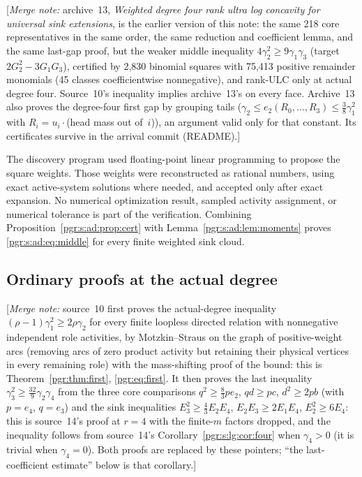 \documentclass[11pt]{article}
\numberwithin{equation}{section}
\theoremstyle{definition}\newtheorem{definition}[theorem]{Definition}\newtheorem{remark}[theorem]{Remark}
\newcommand{\mnote}[1]{[\textit{Merge note:} #1]}
\begin{document}
\mnote{archive~13, \emph{Weighted degree four rank ultra log concavity for
universal sink extensions}, is the earlier version of this note: the same
218 core representatives in the same order, the same reduction and
coefficient lemma, and the same last-gap proof, but the weaker middle
inequality $4\gamma_2^2\ge9\gamma_1\gamma_3$ (target $2G_2^2-3G_1G_3$),
certified by 2,830 binomial squares with 75,413 positive remainder
monomials (45 classes coefficientwise nonnegative), and rank-ULC only at
actual degree four. Source~10's inequality implies archive~13's on every
face. Archive~13 also proves the degree-four first gap by grouping tails
($\gamma_2\le e_2(R_0,\ldots,R_3)\le\frac38\gamma_1^2$ with
$R_i=u_i\cdot$(head mass out of~$i$)), an argument valid only for that
constant. Its certificates survive in the arrival commit (README).}

The discovery program used floating-point linear programming to propose the square weights. Those weights were reconstructed as rational numbers, using exact active-system solutions where needed, and accepted only after exact expansion. No numerical optimization result, sampled activity assignment, or numerical tolerance is part of the verification. Combining Proposition~\ref{pgr:s:ad:prop:cert} with Lemma~\ref{pgr:s:ad:lem:moments} proves \eqref{pgr:s:ad:eq:middle} for every finite weighted sink cloud.

\subsection{Ordinary proofs at the actual degree}

\mnote{source~10 first proves the actual-degree inequality
$(\rho-1)\gamma_1^2\ge2\rho\gamma_2$ for every finite loopless directed
relation with nonnegative independent role activities, by Motzkin--Straus
on the graph of positive-weight arcs (removing arcs of zero product
activity but retaining their physical vertices in every remaining role)
with the mass-shifting proof of the bound: this is
Theorem~\ref{pgr:thm:first}, \eqref{pgr:eq:first}. It then proves the last
inequality $\gamma_3^2\ge\frac{32}{9}\gamma_2\gamma_4$ from the three core
comparisons $q^2\ge\frac83pe_2$, $qd\ge pc$, $d^2\ge2pb$ (with $p=e_4$,
$q=e_3$) and the sink inequalities $E_3^2\ge\frac43E_2E_4$,
$E_2E_3\ge2E_1E_4$, $E_2^2\ge6E_4$: this is source~14's proof at $r=4$ with
the finite-$m$ factors dropped, and the inequality follows from source~14's
Corollary~\ref{pgr:s:lg:cor:four} when $\gamma_4>0$ (it is trivial when
$\gamma_4=0$). Both proofs are replaced by these pointers; ``the
last-coefficient estimate'' below is that corollary.}
\end{document}
